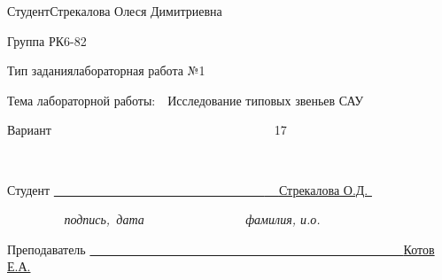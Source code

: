 \vspace{\baselineskip}

\vspace{\baselineskip}
Студент\quad \quad \quad \quad Стрекалова Олеся Димитриевна\par


\vspace{\baselineskip}
Группа \quad \quad \quad \quad РК6-82\par


\vspace{\baselineskip}
Тип задания\quad \quad \quad лабораторная работа №1\par


\vspace{\baselineskip}
Тема лабораторной работы:\ \  Исследование типовых звеньев САУ \par


\vspace{\baselineskip}
Вариант\ \ \ \ \ \ \ \ \ \ \ \ \ \ \ \ \ \ \ \ \ \ \ \ \ \ \ \ \ \ \ \ \ \ \ \  17\par

\ \ \ \ \ \ \ \ \ \ \ \ \ \ \ \ \ \  \ \ \ \ \ \ \ \ \ \ \ \ \ \ \ \ \ \ \ \ \  \par


\vspace{\baselineskip}

\vspace{\baselineskip}

\vspace{\baselineskip}

\vspace{\baselineskip}

\vspace{\baselineskip}
Студент \quad \quad \quad \quad \quad \underline{\ \ \ \ \ \ \ \ \ \ \ \ \ \ \ \ \ \ \ \ \ \ \ \ \ \ \ \ \ \ \ \ \ \  \textbf{\ \   }Стрекалова О.Д. }\textbf{\ \  }\par

\begin{adjustwidth}{0.49in}{0.39in}
\quad \quad \quad \textit{\quad \ \ \ \ \ \ \ \ \ подпись,\ дата\ \ \ \ \ \ \ \ \ \ \ \ \ \ \ \    фамилия, и.о.\ \ \ \ \ \ \ \ \ \ \  }\par

\end{adjustwidth}


\vspace{\baselineskip}
Преподаватель \quad \quad \quad \quad \textbf{\underline{\ \ \ \ \ \ \ \ \ \ \ \ \ \ \ \ \ \ \ \ \ \ \ \ \ \ \ \ \ \ \ \ \ \ \ \  \  \ \ \ \  \ \ \   }}\underline{Котов Е.А. \textbf{ }}\par

